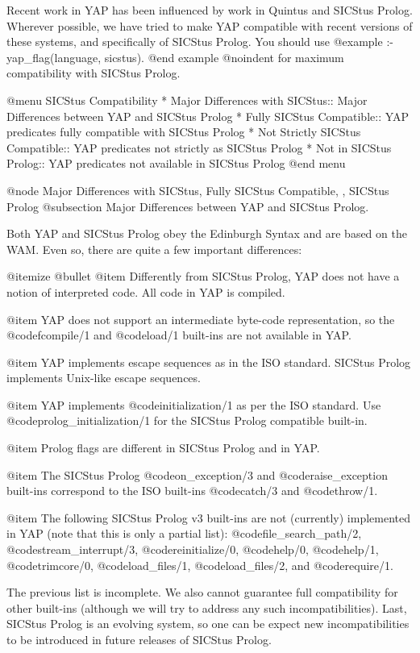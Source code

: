 {{{{{{{{{Recent work in YAP has been influenced by work in Quintus and
SICStus Prolog. Wherever possible, we have tried to make YAP
compatible with recent versions of these systems, and specifically of
SICStus Prolog. You should use 
@example
:- yap_flag(language, sicstus).
@end example
@noindent
for maximum compatibility with SICStus Prolog.

@menu
SICStus Compatibility
* Major Differences with SICStus:: Major Differences between YAP and SICStus Prolog
* Fully SICStus Compatible:: YAP predicates fully compatible with
SICStus Prolog
* Not Strictly SICStus Compatible:: YAP predicates not strictly as
SICStus Prolog
* Not in SICStus Prolog:: YAP predicates not available in SICStus Prolog
@end menu

@node Major Differences with SICStus, Fully SICStus Compatible, , SICStus Prolog
@subsection Major Differences between YAP and SICStus Prolog.

Both YAP and SICStus Prolog obey the Edinburgh Syntax and are based on
the WAM. Even so, there are quite a few important differences:

@itemize @bullet
@item Differently from SICStus Prolog, YAP does not have a
notion of interpreted code. All code in YAP is compiled.

@item YAP does not support an intermediate byte-code
representation, so the @code{fcompile/1} and @code{load/1} built-ins are
not available in YAP.

@item YAP implements escape sequences as in the ISO standard. SICStus
Prolog implements Unix-like escape sequences.

@item YAP implements @code{initialization/1} as per the ISO
standard. Use @code{prolog_initialization/1} for the SICStus Prolog
compatible built-in.

@item Prolog flags are different in SICStus Prolog and in YAP.

@item The SICStus Prolog @code{on_exception/3} and
@code{raise_exception} built-ins correspond to the ISO built-ins
@code{catch/3} and @code{throw/1}.

@item The following SICStus Prolog v3 built-ins are not (currently)
implemented in YAP (note that this is only a partial list):
@code{file_search_path/2},
@code{stream_interrupt/3}, @code{reinitialize/0}, @code{help/0},
@code{help/1}, @code{trimcore/0}, @code{load_files/1},
@code{load_files/2}, and @code{require/1}.

      The previous list is incomplete. We also cannot guarantee full
compatibility for other built-ins (although we will try to address any
such incompatibilities). Last, SICStus Prolog is an evolving system, so
one can be expect new incompatibilities to be introduced in future
releases of SICStus Prolog.

}}}}}}}}}
